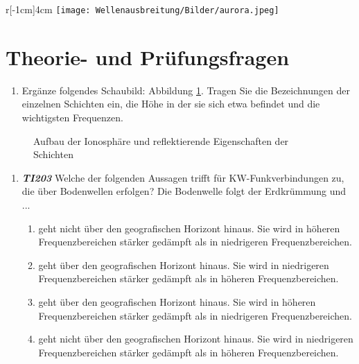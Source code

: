 \begin{wrapfigure}[0]{r}[-1cm]{4cm}
 \vspace{-6cm}
  \texttt{[image: Wellenausbreitung/Bilder/aurora.jpeg]}
 \vspace{-6cm}
\end{wrapfigure}

\section*{Theorie- und Prüfungsfragen}

\begin{enumerate} 
\itemsep1pt\parskip0pt
\item[1] Ergänze folgendes Schaubild: Abbildung  \ref{welle}. Tragen Sie die Bezeichnungen der einzelnen Schichten ein, die Höhe in der sie sich etwa befindet und die wichtigsten Frequenzen.
\end{enumerate}

\begin{figure}[H]
\def\svgwidth{\columnwidth}

\caption{Aufbau der Ionosphäre und reflektierende Eigenschaften der Schichten}
\label{welle}
\end{figure}


\loesung{
\begin{figure}[H]
\def\svgwidth{\columnwidth}

\end{figure}
}

\begin{enumerate} 
\itemsep1pt\parskip0pt
\item[2] \emph{\textbf{TI203}}  Welche der folgenden Aussagen trifft für KW-Funkverbindungen zu, die über Bodenwellen erfolgen? Die Bodenwelle folgt der Erdkrümmung und ...
	\begin{enumerate}
	\itemsep1pt\parskip0pt
		\item[A] geht nicht über den geografischen Horizont hinaus. Sie wird in höheren Frequenzbereichen stärker gedämpft als in niedrigeren Frequenzbereichen.
		\item[B] geht über den geografischen Horizont hinaus. Sie wird in niedrigeren Frequenzbereichen stärker gedämpft als in höheren Frequenzbereichen.
		\item[C] geht über den geografischen Horizont hinaus. Sie wird in höheren Frequenzbereichen stärker gedämpft als in niedrigeren Frequenzbereichen.
		\item[D] geht nicht über den geografischen Horizont hinaus. Sie wird in niedrigeren Frequenzbereichen stärker gedämpft als in höheren Frequenzbereichen.
	\end{enumerate}
\end{enumerate}

